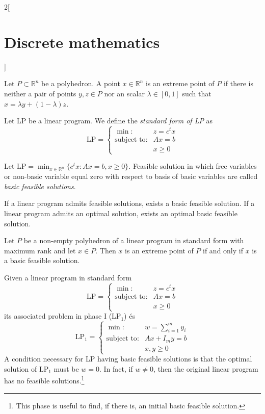 \documentclass[class=article,10pt,crop=false]{standalone}
\begin{document}
\begin{multicols}{2}[\section{Discrete mathematics}]
\begin{definition}
\end{definition}
\begin{definition}
Let $P\subset\mathbb{R}^n$ be a polyhedron. A point $x\in\mathbb{R}^n$ is an extreme point of $P$ if there is neither a pair of points $y,z\in P$ nor an scalar $\lambda\in[0,1]$ such that $x=\lambda y+(1-\lambda)z$.
\end{definition}
\begin{definition}
Let LP be a linear program. We define the \textit{standard form of LP} as $$\text{LP}=\left\{\begin{array}{rc}
    \min: & z=c^tx \\
    \text{subject to}: & Ax=b\\
     & x\geq 0
    \end{array}\right.$$
\end{definition}
\begin{definition}
Let $\displaystyle \text{LP}=\min_{x\in\mathbb{R}^n}\{c^tx:Ax=b,x\geq 0\}$. Feasible solution in which free variables or non-basic variable equal zero with respect to basis of basic variables are called \textit{basic feasible solutions}.
\end{definition}
\begin{prop}
If a linear program admits feasible solutions, exists a basic feasible solution. If a linear program admits an optimal solution, exists an optimal basic feasible solution.
\end{prop}
\begin{theorem}
Let $P$ be a non-empty polyhedron of a linear program in standard form with maximum rank and let $x\in P$. Then $x$ is an extreme point of $P$ if and only if $x$ is a basic feasible solution.
\end{theorem}
\begin{definition}
Given a linear program in standard form $$\text{LP}=\left\{\begin{array}{rc}
    \min: & z=c^tx \\
    \text{subject to}: & Ax=b\\
     & x\geq 0
    \end{array}\right.$$ its associated problem in phase I ($\text{LP}_1$) és $$\text{LP}_1=\left\{\begin{array}{rc}
    \min: & \displaystyle w=\sum_{i=1}^my_i \\
    \text{subject to}: & Ax+I_my=b\\
     & x,y\geq 0
    \end{array}\right.$$
    A condition necessary for LP having basic feasible solutions is that the optimal solution of $\text{LP}_1$ must be $w=0$. In fact, if $w\ne 0$, then the original linear program has no feasible solutions.\footnote{This phase is useful to find, if there is, an initial basic feasible solution.}

\end{definition}
\end{multicols}
\end{document}

